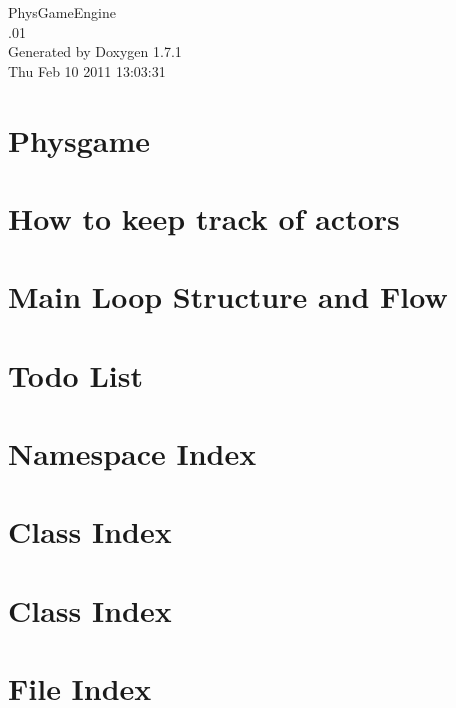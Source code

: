 \documentclass[a4paper]{book}
\begin{document}
\hypersetup{pageanchor=false}
\begin{titlepage}
\vspace*{7cm}
\begin{center}
{\Large PhysGameEngine \\[1ex]\large .01 }\\
\vspace*{1cm}
{\large Generated by Doxygen 1.7.1}\\
\vspace*{0.5cm}
{\small Thu Feb 10 2011 13:03:31}\\
\end{center}
\end{titlepage}
\clearemptydoublepage
{}
\tableofcontents
\clearemptydoublepage
{}
\hypersetup{pageanchor=true}
\chapter{Physgame}
\label{index}\hypertarget{index}{}
\chapter{How to keep track of actors}
\label{actorcontainer1}
\hypertarget{actorcontainer1}{}

\chapter{Main Loop Structure and Flow}
\label{mainloop1}
\hypertarget{mainloop1}{}

\chapter{Todo List}
\label{todo}
\hypertarget{todo}{}

\chapter{Namespace Index}

\chapter{Class Index}

\chapter{Class Index}

\chapter{File Index}

\end{document}
